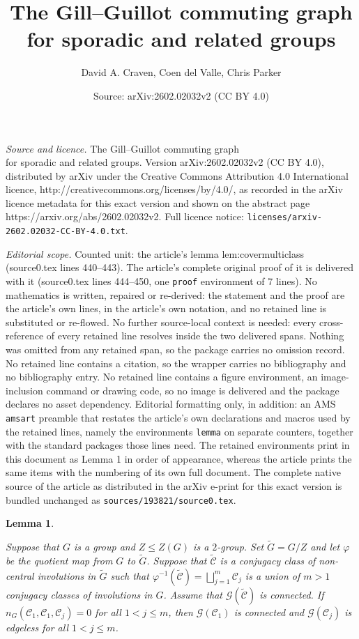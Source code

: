 \documentclass[10pt,a4paper]{amsart}
\title{The Gill--Guillot commuting graph \\for sporadic and related groups\vspace*{-0.4cm}}
\author{David A. Craven, Coen del Valle, Chris Parker}
\date{Source: arXiv:2602.02032v2 (CC BY 4.0)}
\newtheorem{lemma}{Lemma}
\newcommand{\GG}{\mathcal{G}}
\begin{document}
\maketitle

\noindent\emph{Source and licence.} The Gill--Guillot commuting graph \\for sporadic and related groups\vspace*{-0.4cm}. Version arXiv:2602.02032v2 (CC BY 4.0), distributed by arXiv under the Creative Commons Attribution 4.0 International licence, http://creativecommons.org/licenses/by/4.0/, as recorded in the arXiv licence metadata for this exact version and shown on the abstract page https://arxiv.org/abs/2602.02032v2. Full licence notice: \texttt{licenses/arxiv-2602.02032-CC-BY-4.0.txt}.\par\smallskip

\noindent\textit{Editorial scope.} Counted unit: the article's lemma lem:covermulticlass (source0.tex lines 440--443). The article's complete original proof of it is delivered with it (source0.tex lines 444--450, one \texttt{proof} environment of 7 lines). No mathematics is written, repaired or re-derived: the statement and the proof are the article's own lines, in the article's own notation, and no retained line is substituted or re-flowed.  No further source-local context is needed: every cross-reference of every retained line resolves inside the two delivered spans.  Nothing was omitted from any retained span, so the package carries no omission record.  No retained line contains a citation, so the wrapper carries no bibliography and no bibliography entry.  No retained line contains a figure environment, an image-inclusion command or drawing code, so no image is delivered and the package declares no asset dependency.  Editorial formatting only, in addition: an AMS \texttt{amsart} preamble that restates the article's own declarations and macros used by the retained lines, namely the environments \texttt{lemma} on separate counters, together with the standard packages those lines need.  The retained environments print in this document as Lemma 1 in order of appearance, whereas the article prints the same items with the numbering of its own full document.  The complete native source of the article as distributed in the arXiv e-print for this exact version is bundled unchanged as \texttt{sources/193821/source0.tex}.
\begin{lemma}\label{lem:covermulticlass}

Suppose that $G$ is a group and $Z \le Z(G)$ is a $2$-group. Set $\widetilde{G}=G/Z$ and let $\varphi$ be the quotient map from $G$ to $\widetilde{G}$. Suppose that $\widetilde{\mathcal{C}}$ is a conjugacy class of non-central involutions in $\widetilde G$ such that $ \varphi^{-1}(\widetilde{\mathcal{C}})= \bigsqcup_{j=1}^m\mathcal{C}_j $ is a union of $m>1$ conjugacy classes of involutions in $G$. Assume that $\GG(\widetilde{\mathcal{C}})$ is connected. If $n_G(\mathcal{C}_1,\mathcal{C}_1,\mathcal{C}_j)=0$ for all $1< j\leq m$, then $\GG(\mathcal{C}_1)$ is connected and $\GG(\mathcal{C}_j)$ is edgeless for all $1<j\leq m$.
\end{lemma}
\end{document}
